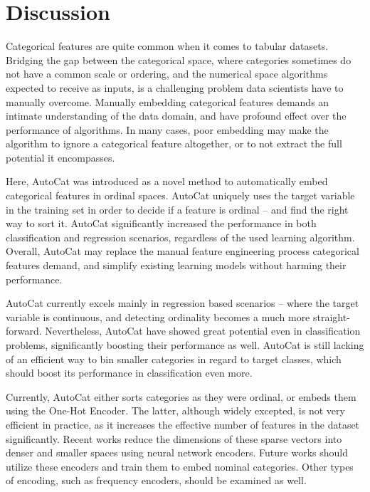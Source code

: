 \documentclass{article}
\begin{document}
\section{Discussion}
Categorical features are quite common when it comes to tabular datasets. Bridging the gap between the categorical space, where categories sometimes do not have a common scale or ordering, and the numerical space algorithms expected to receive as inputs, is a challenging problem data scientists have to manually overcome. Manually embedding categorical features demands an intimate understanding of the data domain, and have profound effect over the performance of algorithms. In many cases, poor embedding may make the algorithm to ignore a categorical feature altogether, or to not extract the full potential it encompasses.

Here, AutoCat was introduced as a novel method to automatically embed categorical features in ordinal spaces. AutoCat uniquely uses the target variable in the training set in order to decide if a feature is ordinal -- and find the right way to sort it. AutoCat significantly increased the performance in both classification and regression scenarios, regardless of the used learning algorithm. Overall, AutoCat may replace the manual feature engineering process categorical features demand, and simplify existing learning models without harming their performance.

AutoCat currently excels mainly in regression based scenarios -- where the target variable is continuous, and detecting ordinality becomes a much more straight-forward. Nevertheless, AutoCat have showed great potential even in classification problems, significantly boosting their performance as well. AutoCat is still lacking of an efficient way to bin smaller categories in regard to target classes, which should boost its performance in classification even more.

Currently, AutoCat either sorts categories as they were ordinal, or embeds them using the One-Hot Encoder. The latter, although widely excepted, is not very efficient in practice, as it increases the effective number of features in the dataset significantly. Recent works reduce the dimensions of these sparse vectors into denser and smaller spaces using neural network encoders. Future works should utilize these encoders and train them to embed nominal categories. Other types of encoding, such as frequency encoders, should be examined as well.





\end{document}
